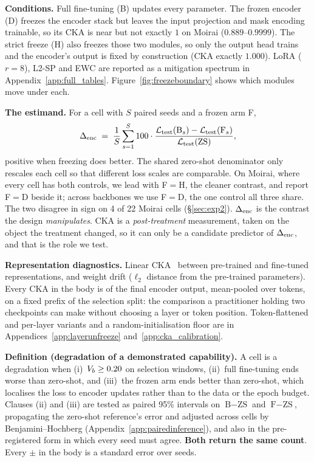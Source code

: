 \textbf{Conditions.}  Full fine-tuning (B) updates every parameter.  The frozen
encoder (D) freezes the encoder stack but leaves the input projection and mask
encoding trainable, so its CKA is near but not exactly $1$ on Moirai
($0.889$--$0.9999$).  The strict freeze (H) also freezes those two modules,
so only the output head trains and the encoder's output is fixed by construction
(CKA exactly $1.000$).  LoRA ($r{=}8$), L2-SP and EWC are reported as a
mitigation spectrum in Appendix~\ref{app:full_tables}.
Figure~\ref{fig:freezeboundary} shows which modules move under each.

\textbf{The estimand.}  For a cell with $S$ paired seeds and a frozen arm F,
\begin{equation}
\label{eq:denc}
\Delta_\text{enc} \;=\; \frac{1}{S}\sum_{s=1}^{S} 100 \cdot
\frac{\mathcal{L}_\text{test}(\text{B}_s) - \mathcal{L}_\text{test}(\text{F}_s)}
     {\mathcal{L}_\text{test}(\text{ZS})},
\end{equation}
positive when freezing does better.  The shared zero-shot denominator only
rescales each cell so that different loss scales are comparable.  On Moirai, where
every cell has both controls, we lead with F${=}$H, the cleaner contrast, and
report F${=}$D beside it; across backbones we use F${=}$D, the one control all
three share.  The two disagree in sign on 4 of 22 Moirai cells
(\S\ref{sec:exp2}).  $\Delta_\text{enc}$ is the contrast the design \emph{manipulates}.
CKA is a \emph{post-treatment} measurement, taken on the object the treatment
changed, so it can only be a candidate predictor of $\Delta_\text{enc}$, and that is the
role we test.

\textbf{Representation diagnostics.}  Linear CKA~\citep{kornblith2019cka}
between pre-trained and fine-tuned representations, and weight drift ($\ell_2$
distance from the pre-trained parameters).  Every CKA in the body is of the final
encoder output, mean-pooled over tokens, on a fixed prefix of the selection split:
the comparison a practitioner holding two checkpoints can make without choosing a
layer or token position.  Token-flattened and per-layer variants and a
random-initialisation floor are in
Appendices~\ref{app:layerunfreeze} and~\ref{app:cka_calibration}.

\textbf{Definition (degradation of a demonstrated capability).}  A cell is a
degradation when (i)~$V_{b} \ge 0.20$ on selection windows, (ii)~full fine-tuning
ends worse than zero-shot, and (iii)~the frozen arm ends better than zero-shot,
which localises the loss to encoder updates rather than to the data or the epoch
budget.  Clauses (ii) and (iii) are tested as paired 95\% intervals on
$\text{B}{-}\text{ZS}$ and $\text{F}{-}\text{ZS}$, propagating the zero-shot
reference's error and adjusted across cells by Benjamini--Hochberg
(Appendix~\ref{app:pairedinference}), and also in the pre-registered form in
which every seed must agree.  \textbf{Both return the same count}.  Every ${\pm}$
in the body is a standard error over seeds.

